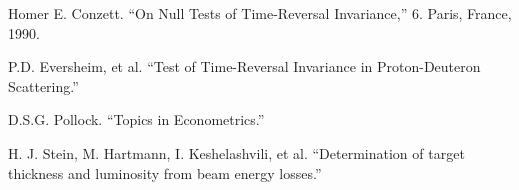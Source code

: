 \documentclass[reprint]{revtex4-1}
\begin{document}
\begin{thebibliography}{9}
Homer E. Conzett. ``On Null Tests of Time-Reversal Invariance,'' 6. Paris, France, 1990. %

P.D. Eversheim, et al. ``Test of Time-Reversal Invariance in Proton-Deuteron Scattering.''

D.S.G. Pollock. ``Topics in Econometrics.'' %

H. J. Stein, M. Hartmann, I. Keshelashvili, et al. ``Determination of target thickness and luminosity from beam energy losses.''

\end{thebibliography}
\end{document}
